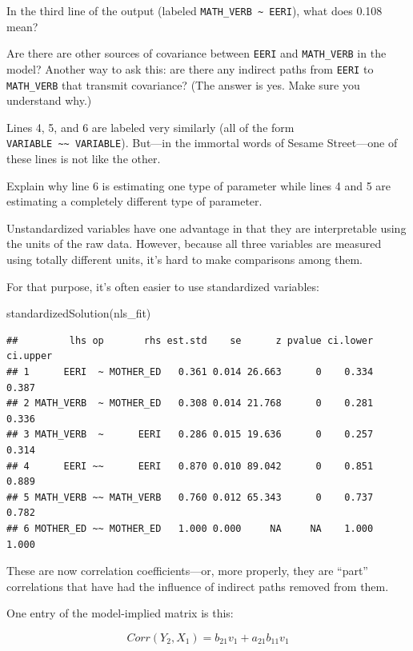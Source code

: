\documentclass[
]{book}
\newenvironment{Shaded}{\begin{snugshade}}{\end{snugshade}}
\newcommand{\FunctionTok}[1]{\textcolor[rgb]{0.00,0.00,0.00}{#1}}
\newcommand{\NormalTok}[1]{#1}
\begin{document}
In the third line of the output (labeled \texttt{MATH\_VERB\ \textasciitilde{}\ EERI}), what does 0.108 mean?

Are there are other sources of covariance between \texttt{EERI} and \texttt{MATH\_VERB} in the model? Another way to ask this: are there any indirect paths from \texttt{EERI} to \texttt{MATH\_VERB} that transmit covariance? (The answer is yes. Make sure you understand why.)

Lines 4, 5, and 6 are labeled very similarly (all of the form \texttt{VARIABLE\ \textasciitilde{}\textasciitilde{}\ VARIABLE}). But---in the immortal words of Sesame Street---one of these lines is not like the other.

Explain why line 6 is estimating one type of parameter while lines 4 and 5 are estimating a completely different type of parameter.

Unstandardized variables have one advantage in that they are interpretable using the units of the raw data. However, because all three variables are measured using totally different units, it's hard to make comparisons among them.

For that purpose, it's often easier to use standardized variables:

\begin{Shaded}
\begin{Highlighting}[]
\FunctionTok{standardizedSolution}\NormalTok{(nls\_fit)}
\end{Highlighting}
\end{Shaded}

\begin{verbatim}
##         lhs op       rhs est.std    se      z pvalue ci.lower ci.upper
## 1      EERI  ~ MOTHER_ED   0.361 0.014 26.663      0    0.334    0.387
## 2 MATH_VERB  ~ MOTHER_ED   0.308 0.014 21.768      0    0.281    0.336
## 3 MATH_VERB  ~      EERI   0.286 0.015 19.636      0    0.257    0.314
## 4      EERI ~~      EERI   0.870 0.010 89.042      0    0.851    0.889
## 5 MATH_VERB ~~ MATH_VERB   0.760 0.012 65.343      0    0.737    0.782
## 6 MOTHER_ED ~~ MOTHER_ED   1.000 0.000     NA     NA    1.000    1.000
\end{verbatim}

These are now correlation coefficients---or, more properly, they are ``part'' correlations that have had the influence of indirect paths removed from them.

One entry of the model-implied matrix is this:

\[
Corr(Y_{2}, X_{1})  = b_{21}v_{1} + a_{21}b_{11}v_{1}
\]
\end{document}
